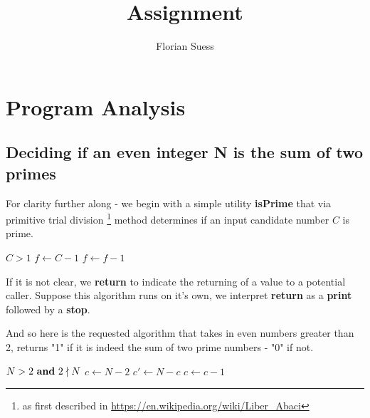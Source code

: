 \documentclass{article}
\title{Assignment}
\author{Florian Suess}
\begin{document}
\maketitle
\section{Program Analysis}
\subsection{Deciding if an even integer N is the sum of two primes}
For clarity further along - we begin with a simple utility \textbf{isPrime} that via primitive trial division \footnote{as first described in \url{https://en.wikipedia.org/wiki/Liber_Abaci}} method determines if an input candidate number $C$ is prime.

\vspace{1em}
\begin{algorithmic}[1]
	\REQUIRE $C > 1$
	\ENDIF
	\STATE $f \leftarrow C - 1$
		\ENDIF
		\STATE $f \leftarrow f - 1$
	\ENDWHILE
\end{algorithmic}
\vspace{1em}

If it is not clear, we \textbf{return} to indicate the returning of a value to a potential caller. Suppose this algorithm runs on it's own, we interpret \textbf{return} as a \textbf{print} followed by a \textbf{stop}.

\pagebreak

And so here is the requested algorithm that takes in even numbers greater than 2, returns "1" if it is indeed the sum of two prime numbers - "0" if not.

\vspace{1em}
\begin{algorithmic}[1]
	\REQUIRE $N > 2 \text{ \textbf{and} } 2 \nmid N$
	\STATE $c \leftarrow N - 2$
			\STATE $c' \leftarrow N - c$
			\ENDIF
		\ENDIF
		\STATE $c \leftarrow c - 1$
	\ENDWHILE
\end{algorithmic}
\vspace{1em}
\end{document}
